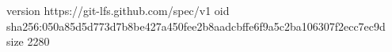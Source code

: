 version https://git-lfs.github.com/spec/v1
oid sha256:050a85d5d773d7b8be427a450fee2b8aadcbffe6f9a5c2ba106307f2ecc7ec9d
size 2280
